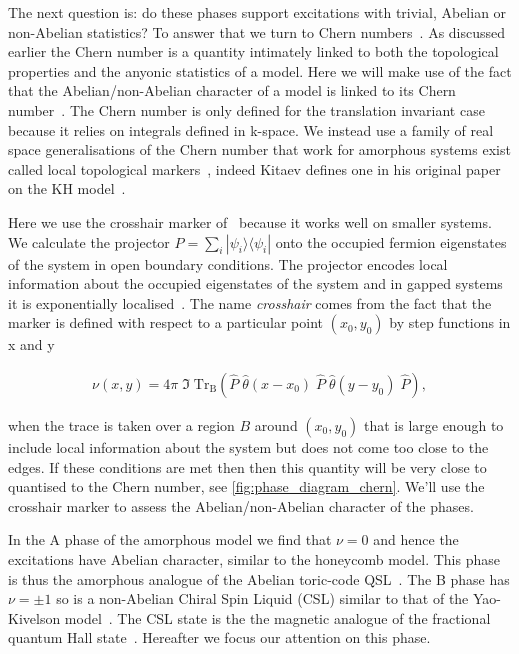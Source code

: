 The next question is: do these phases support excitations with trivial, Abelian or non-Abelian statistics? To answer that we turn to Chern numbers~\autocite{berryQuantalPhaseFactors1984,simonHolonomyQuantumAdiabatic1983,thoulessQuantizedHallConductance1982}. As discussed earlier the Chern number is a quantity intimately linked to both the topological properties and the anyonic statistics of a model. Here we will make use of the fact that the Abelian/non-Abelian character of a model is linked to its Chern number~\autocite{kitaevAnyonsExactlySolved2006}. The Chern number is only defined for the translation invariant case because it relies on integrals defined in k-space. We instead use a family of real space generalisations of the Chern number that work for amorphous systems exist called local topological markers~\autocite{bianco_mapping_2011,Hastings_Almost_2010,mitchellAmorphousTopologicalInsulators2018}, indeed Kitaev defines one in his original paper on the KH model~\autocite{kitaevAnyonsExactlySolved2006}.

Here we use the crosshair marker of~\autocite{peru_preprint} because it works well on smaller systems. We calculate the projector \(P = \sum_i |\psi_i\rangle \langle \psi_i|\) onto the occupied fermion eigenstates of the system in open boundary conditions. The projector encodes local information about the occupied eigenstates of the system and in gapped systems it is exponentially localised~\autocite{hastingsLiebSchultzMattisHigherDimensions2004}. The name \emph{crosshair} comes from the fact that the marker is defined with respect to a particular point \((x_0, y_0)\) by step functions in x and y

\[\begin{aligned}
    \nu (x, y) = 4\pi \; \Im\; \mathrm{Tr}_{\mathrm{B}} 
    \left ( 
    \hat{P}\;\hat{\theta}(x-x_0)\;\hat{P}\;\hat{\theta}(y-y_0)\; \hat{P}
    \right ),
\end{aligned}\]

when the trace is taken over a region \(B\) around \((x_0, y_0)\) that is large enough to include local information about the system but does not come too close to the edges. If these conditions are met then then this quantity will be very close to quantised to the Chern number, see \cref{fig:phase_diagram_chern}. We'll use the crosshair marker to assess the Abelian/non-Abelian character of the phases.

In the A phase of the amorphous model we find that \(\nu=0\) and hence the excitations have Abelian character, similar to the honeycomb model. This phase is thus the amorphous analogue of the Abelian toric-code QSL~\autocite{kitaev_fault-tolerant_2003}. The B phase has \(\nu=\pm1\) so is a non-Abelian Chiral Spin Liquid (CSL) similar to that of the Yao-Kivelson model~\autocite{yaoExactChiralSpin2007}. The CSL state is the the magnetic analogue of the fractional quantum Hall state~\autocite{laughlinPropertiesChiralspinliquidState1990}. Hereafter we focus our attention on this phase.


